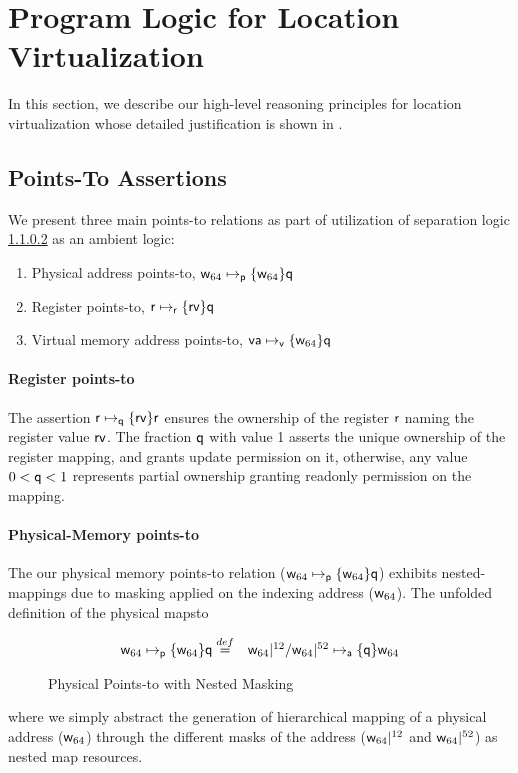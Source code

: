 \section{Program Logic for Location Virtualization}
\label{sec:logic}
In this section, we describe our high-level reasoning principles for location virtualization whose detailed justification is shown in . 
\subsection{Points-To Assertions}
\label{sec:pointsto}

We present three main points-to relations as part of utilization of separation logic \ref{} as an ambient logic:
\begin{enumerate}
\item Physical address points-to, $\mathsf{w}_{64}\mapsto_{\mathsf{p}}\{\mathsf{w}_{64}\}\mathsf{q}$
\item Register points-to, $\mathsf{r}\mapsto_{\mathsf{r}}\{\mathsf{rv}\}\mathsf{q}$
\item Virtual memory address points-to, $\mathsf{va}\mapsto_{\mathsf{v}}\{\mathsf{w}_{64}\}\mathsf{q}$
\end{enumerate}
\paragraph{Register points-to} The assertion $\mathsf{r}\mapsto_{\mathsf{q}}\{\mathsf{rv}\}\mathsf{r}$ ensures the ownership of the register $\mathsf{r}$ naming the register value $\mathsf{rv}$. The fraction $\mathsf{q}$ with value 1 asserts the unique ownership of the register mapping, and grants update permission on it, otherwise, any value $0 < \mathsf{q} <1$ represents partial ownership granting readonly permission on the mapping.
\paragraph{Physical-Memory points-to} The our physical memory points-to relation ($\mathsf{w}_{64}\mapsto_{\mathsf{p}}\{\mathsf{w}_{64}\}\mathsf{q}$) exhibits nested-mappings due to masking applied on the indexing address ($\mathsf{w}_{64}$). The unfolded definition of the physical mapsto 
\begin{figure}[!ht]
\[
\begin{array}{cl}
\mathsf{w}_{64}\mapsto_{\mathsf{p}}\{\mathsf{w}_{64}\}\mathsf{q} \stackrel{def}{=} & \mathsf{w}_{64}|^{12} / \mathsf{w}_{64}|^{52} \mapsto_{\mathsf{a}}\{\mathsf{q}\}\mathsf{w}_{64}
\end{array}
\]
\caption{Physical Points-to with Nested Masking}
  \label{fig:physicalpointsto}
\end{figure}
where we simply abstract the generation of hierarchical mapping of a physical address ($\mathsf{w}_{64}$) through the different masks of the address ($\mathsf{w}_{64}|^{12}$ and $\mathsf{w}_{64}|^{52}$) as nested map resources.
